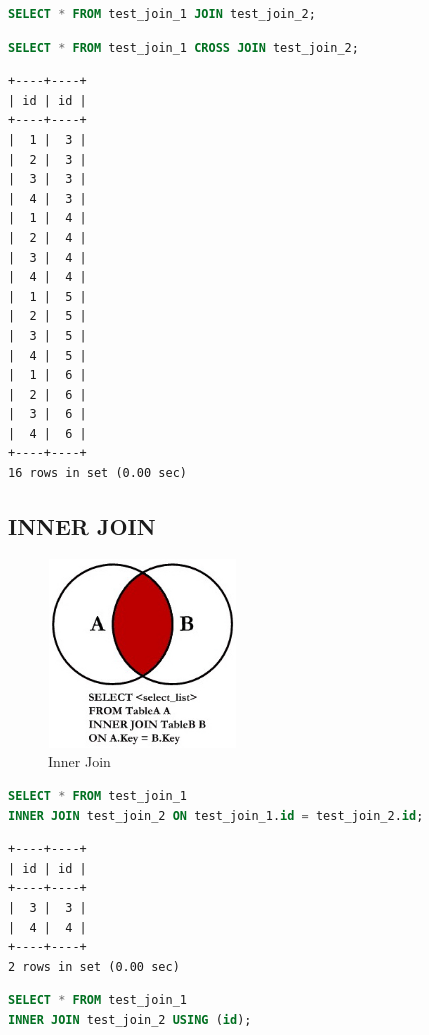 \documentclass[12pt,a4paper]{article}
\begin{document}
\begin{lstlisting}[language=SQL]
SELECT * FROM test_join_1 JOIN test_join_2;
\end{lstlisting}

\begin{lstlisting}[language=SQL]
SELECT * FROM test_join_1 CROSS JOIN test_join_2;
\end{lstlisting}

\begin{lstlisting}[basicstyle = \tiny\ttfamily, columns = fixed]
+----+----+
| id | id |
+----+----+
|  1 |  3 |
|  2 |  3 |
|  3 |  3 |
|  4 |  3 |
|  1 |  4 |
|  2 |  4 |
|  3 |  4 |
|  4 |  4 |
|  1 |  5 |
|  2 |  5 |
|  3 |  5 |
|  4 |  5 |
|  1 |  6 |
|  2 |  6 |
|  3 |  6 |
|  4 |  6 |
+----+----+
16 rows in set (0.00 sec)
\end{lstlisting}

\subsection{INNER JOIN}

\begin{figure}[!ht]
    \includegraphics[width=5cm,height=5cm]{images/Lab5/inner_join.jpg}
    \caption{Inner Join}
    \label{fig:InnerJoin}
\end{figure}

\begin{lstlisting}[language=SQL]
SELECT * FROM test_join_1 
INNER JOIN test_join_2 ON test_join_1.id = test_join_2.id;
\end{lstlisting}

\begin{lstlisting}[basicstyle = \tiny\ttfamily, columns = fixed]
+----+----+
| id | id |
+----+----+
|  3 |  3 |
|  4 |  4 |
+----+----+
2 rows in set (0.00 sec)
\end{lstlisting}

\begin{lstlisting}[language=SQL]
SELECT * FROM test_join_1 
INNER JOIN test_join_2 USING (id);
\end{lstlisting}
\end{document}
